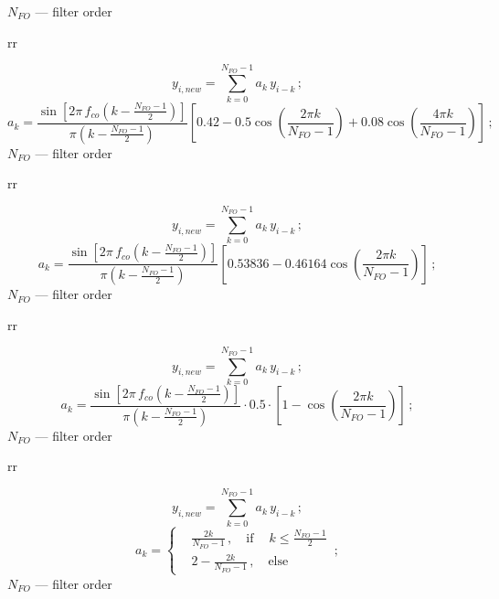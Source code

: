 \documentclass[14pt]{article}
\numberwithin{equation}{part}
\begin{document}
\hspace{5cm} $N_{FO}$ --- filter order

rr

\begin{equation*}
    y_{i,new} = \sum_{k=0}^{N_{FO}-1}a_k\,y_{i-k}\,;
\end{equation*}
\begin{equation*}
    a_k=\frac{\sin\left[2\pi\,f_{co}\left(k-\frac{N_{FO}-1}{2}\right)\right]}{\pi\left(k-\frac{N_{FO}-1}{2}\right)}
    \left[0.42-0.5\cos\left(\frac{2\pi k}{N_{FO}-1}\right)+0.08\cos\left(\frac{4\pi k}{N_{FO}-1}\right)\right]\,;
\end{equation*}
 $N_{FO}$ --- filter order

rr

\begin{equation*}
    y_{i,new} = \sum_{k=0}^{N_{FO}-1}a_k\,y_{i-k}\,;
\end{equation*}
\begin{equation*}
    a_k=\frac{\sin\left[2\pi\,f_{co}\left(k-\frac{N_{FO}-1}{2}\right)\right]}{\pi\left(k-\frac{N_{FO}-1}{2}\right)}
    \left[0.53836-0.46164\cos\left(\frac{2\pi k}{N_{FO}-1}\right)\right]\,;
\end{equation*}
\hspace{1.5cm}
 $N_{FO}$ --- filter order

rr

\begin{equation*}
    y_{i,new} = \sum_{k=0}^{N_{FO}-1}a_k\,y_{i-k}\,;
\end{equation*}
\begin{equation*}
    a_k=\frac{\sin\left[2\pi\,f_{co}\left(k-\frac{N_{FO}-1}{2}\right)\right]}{\pi\left(k-\frac{N_{FO}-1}{2}\right)}
    \cdot0.5\cdot\left[1-\cos\left(\frac{2\pi k}{N_{FO}-1}\right)\right]\,;
\end{equation*}
\hspace{2.5cm}
 $N_{FO}$ --- filter order

rr

\begin{equation*}
    y_{i,new} = \sum_{k=0}^{N_{FO}-1}a_k\,y_{i-k}\,;
\end{equation*}
\begin{equation*}
    a_k=
   \left\{
   \begin{aligned}
   &\frac{2k}{N_{FO}-1}\,, \quad\text{if}\quad \:k\leqslant\frac{N_{FO}-1}{2} \\
   &2-\frac{2k}{N_{FO}-1}\,, \quad\text{else}
    \end{aligned}
     \right.\,;
\end{equation*}
\hspace{5cm}
 $N_{FO}$ --- filter order
\end{document}
